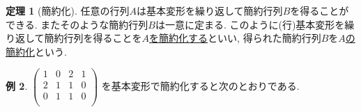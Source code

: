 \documentclass[dvipdfmx,a4paper,11pt]{article}
\theoremstyle{definition}
\newtheorem{thm}{定理}
\newtheorem{exa}[thm]{例}
\begin{document}
 \begin{tcolorbox}[
    colback = white,
    colframe = green!35!black,
    fonttitle = \bfseries,
    breakable = true]
    \begin{thm}[簡約化]
    任意の行列$A$は基本変形を繰り返して簡約行列$B$を得ることができる. またそのような簡約行列$B$は一意に定まる.
 このように(行)基本変形を繰り返して簡約行列を得ることを\underline{$A$を簡約化する}といい, 得られた簡約行列$B$を\underline{$A$の簡約化}という.
   \end{thm}
 \end{tcolorbox}




\begin{exa}
 \label{exa-kanyaku-2}
$
 \begin{pmatrix}
 1& 0& 2  &1\\
 2& 1& 1  &0\\
 0& 1& 1  &0\\
 \end{pmatrix}
 $
 を基本変形で簡約化すると次のとおりである.
 

\end{exa}
\end{document}
